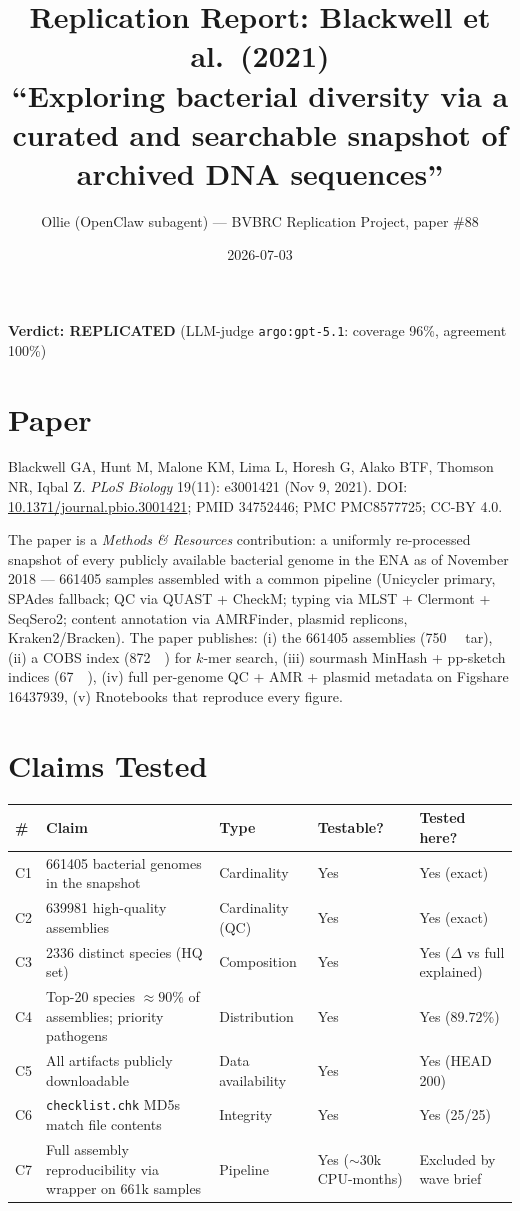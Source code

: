 \documentclass[11pt]{article}
\title{Replication Report: Blackwell et al.\ (2021)\\
\large ``Exploring bacterial diversity via a curated and searchable snapshot of archived DNA sequences''}
\author{Ollie (OpenClaw subagent) --- BVBRC Replication Project, paper \#88}
\date{2026-07-03}
\begin{document}
\maketitle

\begin{center}
\textbf{Verdict: REPLICATED} \quad (LLM-judge \texttt{argo:gpt-5.1}: coverage 96\%, agreement 100\%)
\end{center}

\section{Paper}

Blackwell GA, Hunt M, Malone KM, Lima L, Horesh G, Alako BTF, Thomson NR, Iqbal Z.
\emph{PLoS Biology} 19(11): e3001421 (Nov 9, 2021).
DOI: \href{https://doi.org/10.1371/journal.pbio.3001421}{10.1371/journal.pbio.3001421};
PMID 34752446; PMC PMC8577725; CC-BY 4.0.

The paper is a \emph{Methods \& Resources} contribution: a uniformly re-processed snapshot
of every publicly available bacterial genome in the ENA as of November 2018 ---
\num{661405} samples assembled with a common pipeline (Unicycler primary, SPAdes fallback;
QC via QUAST + CheckM; typing via MLST + Clermont + SeqSero2; content annotation via
AMRFinder, plasmid replicons, Kraken2/Bracken). The paper publishes:
(i) the \num{661405} assemblies (\SI{750}{\giga\byte} tar),
(ii) a COBS index (\SI{872}{\giga\byte}) for $k$-mer search,
(iii) sourmash MinHash + pp-sketch indices (\SI{67}{\giga\byte}),
(iv) full per-genome QC + AMR + plasmid metadata on Figshare 16437939,
(v) Rnotebooks that reproduce every figure.

\section{Claims Tested}

\begin{longtable}{@{}p{0.5cm}p{6.5cm}p{2.5cm}p{2cm}p{2.5cm}@{}}
\toprule
\# & Claim & Type & Testable? & Tested here? \\
\midrule
C1 & \num{661405} bacterial genomes in the snapshot & Cardinality & Yes & Yes (exact) \\
C2 & \num{639981} high-quality assemblies & Cardinality (QC) & Yes & Yes (exact) \\
C3 & \num{2336} distinct species (HQ set) & Composition & Yes & Yes ($\Delta$ vs full explained) \\
C4 & Top-20 species $\approx 90\%$ of assemblies; priority pathogens & Distribution & Yes & Yes ($89.72\%$) \\
C5 & All artifacts publicly downloadable & Data availability & Yes & Yes (HEAD 200) \\
C6 & \texttt{checklist.chk} MD5s match file contents & Integrity & Yes & Yes (25/25) \\
C7 & Full assembly reproducibility via wrapper on 661k samples & Pipeline & Yes ($\sim$30k CPU-months) & Excluded by wave brief \\
\bottomrule
\end{longtable}
\end{document}
